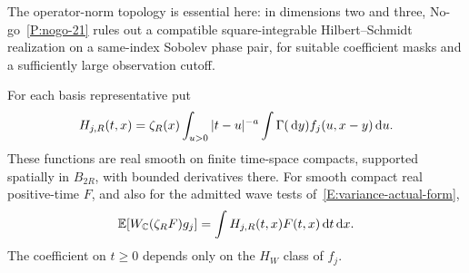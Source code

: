 The operator-norm topology is essential here: in dimensions two and three,
No-go~\ref{P:nogo-21} rules out a compatible square-integrable
Hilbert--Schmidt realization on a same-index Sobolev phase pair,
for suitable coefficient masks and a sufficiently large observation cutoff.


\begin{lemma}\label{L:driver-covariance-coefficients}
  For each basis representative put
  \begin{equation}\label{E:driver-covariance-coefficient}
    H_{j,R}(t,x)=\zeta_R(x)\int_{u>0}|t-u|^{-a}
    \int\Gamma(\,\mathrm{d} y)f_j(u,x-y)\,\mathrm{d} u.
  \end{equation}
  These functions are real smooth on finite time-space compacts, supported
  spatially in $B_{2R}$, with bounded derivatives there. For smooth compact real
  positive-time $F$, and also for the admitted wave tests
  of~\eqref{E:variance-actual-form},
  \begin{equation}\label{E:driver-literal-covariance}
    \mathbb{E}[W_{\mathbb{C}}(\zeta_RF)g_j]
    =\int H_{j,R}(t,x)F(t,x)\,\mathrm{d} t\,\mathrm{d} x.
  \end{equation}
  The coefficient on $t \ge 0$ depends only on the $H_W$ class of $f_j$.
\end{lemma}

